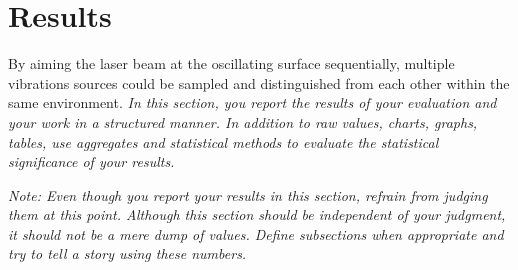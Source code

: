 \section{Results}
\label{sec:results}
 By aiming the laser beam at the oscillating surface sequentially, multiple vibrations sources could be sampled and distinguished from each other within the same environment.
\textit{%
In this section, you report the results of your evaluation and your work in a structured manner.
In addition to raw values, charts, graphs, tables, use aggregates and statistical methods to evaluate the statistical significance of your results.
}

\textit{%
Note: Even though you report your results in this section, refrain from judging them at this point. 
Although this section should be independent of your judgment, it should not be a mere dump of values.
Define subsections when appropriate and try to tell a story using these numbers.
}
